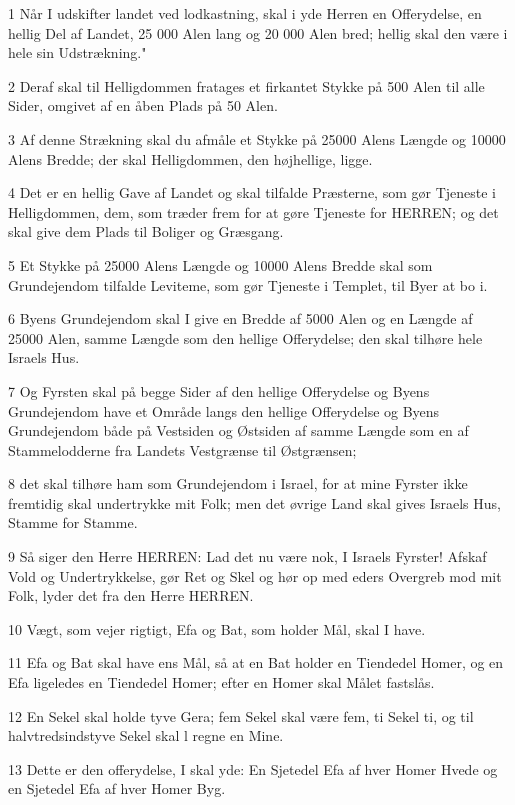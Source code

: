 \par 1 Når I udskifter landet ved lodkastning, skal i yde Herren en Offerydelse, en hellig Del af Landet, 25 000 Alen lang og 20 000 Alen bred; hellig skal den være i hele sin Udstrækning."
\par 2 Deraf skal til Helligdommen fratages et firkantet Stykke på 500 Alen til alle Sider, omgivet af en åben Plads på 50 Alen.
\par 3 Af denne Strækning skal du afmåle et Stykke på 25000 Alens Længde og 10000 Alens Bredde; der skal Helligdommen, den højhellige, ligge.
\par 4 Det er en hellig Gave af Landet og skal tilfalde Præsterne, som gør Tjeneste i Helligdommen, dem, som træder frem for at gøre Tjeneste for HERREN; og det skal give dem Plads til Boliger og Græsgang.
\par 5 Et Stykke på 25000 Alens Længde og 10000 Alens Bredde skal som Grundejendom tilfalde Leviteme, som gør Tjeneste i Templet, til Byer at bo i.
\par 6 Byens Grundejendom skal I give en Bredde af 5000 Alen og en Længde af 25000 Alen, samme Længde som den hellige Offerydelse; den skal tilhøre hele Israels Hus.
\par 7 Og Fyrsten skal på begge Sider af den hellige Offerydelse og Byens Grundejendom have et Område langs den hellige Offerydelse og Byens Grundejendom både på Vestsiden og Østsiden af samme Længde som en af Stammelodderne fra Landets Vestgrænse til Østgrænsen;
\par 8 det skal tilhøre ham som Grundejendom i Israel, for at mine Fyrster ikke fremtidig skal undertrykke mit Folk; men det øvrige Land skal gives Israels Hus, Stamme for Stamme.
\par 9 Så siger den Herre HERREN: Lad det nu være nok, I Israels Fyrster! Afskaf Vold og Undertrykkelse, gør Ret og Skel og hør op med eders Overgreb mod mit Folk, lyder det fra den Herre HERREN.
\par 10 Vægt, som vejer rigtigt, Efa og Bat, som holder Mål, skal I have.
\par 11 Efa og Bat skal have ens Mål, så at en Bat holder en Tiendedel Homer, og en Efa ligeledes en Tiendedel Homer; efter en Homer skal Målet fastslås.
\par 12 En Sekel skal holde tyve Gera; fem Sekel skal være fem, ti Sekel ti, og til halvtredsindstyve Sekel skal l regne en Mine.
\par 13 Dette er den offerydelse, I skal yde: En Sjetedel Efa af hver Homer Hvede og en Sjetedel Efa af hver Homer Byg.
